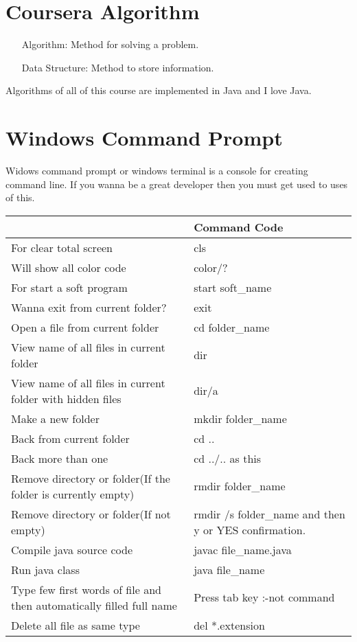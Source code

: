 \documentclass[10 pt]{book}
\begin{document}
\chapter{Coursera Algorithm}
\begin{itemize}
	\item[Algorithm: ] Method for solving a problem.
	\item[Data Structure: ] Method to store information.
\end{itemize}
Algorithms of all of this course are implemented in Java and I love Java. 

\chapter{Windows Command Prompt}
Widows command prompt or windows terminal is a console for creating command line. If you wanna be a great developer then you must get used to uses of this.\\
\begin{center}
	\begin{tabularx}{0.9\textwidth}
	{|>{\raggedright\arraybackslash}X
	 |>{\raggedleft\arraybackslash}X	
	|}
		\hline
		{\color{red}Task}& {\color{red}Command Code}\\
		\hline
		\hline
		For clear total screen & cls\\
		\hline
		Will show all color code & color/?\\
		\hline
		For start a soft program & start soft\_name\\
		\hline
		Wanna exit from current folder? & exit\\
		\hline
		Open a file from current folder & cd folder\_name\\
		\hline
		View name of all files in current folder & dir\\
		\hline
		View name of all files in current folder with hidden files & dir/a\\
		\hline
		Make a new folder & mkdir folder\_name\\
		\hline
		Back from current folder & cd ..\\
		\hline
		Back more than one & cd ../.. as this\\
		\hline
		Remove directory or folder(If the folder is currently empty) & rmdir folder\_name\\
		\hline
		Remove directory or folder(If not empty) & rmdir /s folder\_name and then y or YES confirmation.\\
		\hline
		Compile java source code & javac file\_name.java\\
		\hline
		Run java class & java file\_name\\
		\hline
		Type few first words of file and then automatically filled full name & Press tab key :-not command\\
		\hline
		Delete all file as same type & del *.extension\\
		\hline
		
	\end{tabularx}
\end{center}
\end{document}
